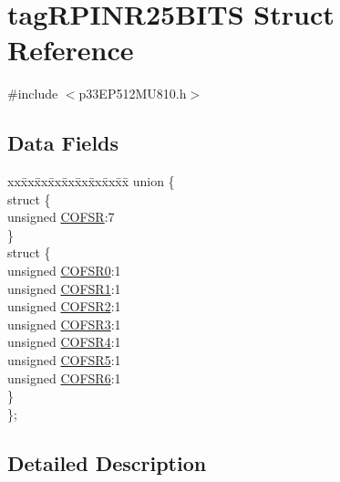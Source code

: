 \hypertarget{structtag_r_p_i_n_r25_b_i_t_s}{}\section{tag\+R\+P\+I\+N\+R25\+B\+I\+TS Struct Reference}
\label{structtag_r_p_i_n_r25_b_i_t_s}


{\ttfamily \#include $<$p33\+E\+P512\+M\+U810.\+h$>$}

\subsection*{Data Fields}
\begin{DoxyCompactItemize}
\item 
\begin{tabbing}
xx\=xx\=xx\=xx\=xx\=xx\=xx\=xx\=xx\=\kill
union \{\\
\>struct \{\\
\>\>unsigned \hyperlink{structtag_r_p_i_n_r25_b_i_t_s_ae600b0bef0d7ebcdb875433ba350e12c}{COFSR}:7\\
\>\} \\
\>struct \{\\
\>\>unsigned \hyperlink{structtag_r_p_i_n_r25_b_i_t_s_a187a459c15bb43212c0ad3ec1005215d}{COFSR0}:1\\
\>\>unsigned \hyperlink{structtag_r_p_i_n_r25_b_i_t_s_a7a8489e33028402e5441d48a82412bfc}{COFSR1}:1\\
\>\>unsigned \hyperlink{structtag_r_p_i_n_r25_b_i_t_s_ab4420ea07d072daf1ba3477a7ba7cc90}{COFSR2}:1\\
\>\>unsigned \hyperlink{structtag_r_p_i_n_r25_b_i_t_s_a49ca3b76cff2558df07fc1bf1fd4472b}{COFSR3}:1\\
\>\>unsigned \hyperlink{structtag_r_p_i_n_r25_b_i_t_s_ad920fb77cd218c24d0d53d15e1d0dd09}{COFSR4}:1\\
\>\>unsigned \hyperlink{structtag_r_p_i_n_r25_b_i_t_s_ab9ef65110b3359ee746828bc96a577de}{COFSR5}:1\\
\>\>unsigned \hyperlink{structtag_r_p_i_n_r25_b_i_t_s_a2eb1261741b67e7a548ea0dfc1e7c7da}{COFSR6}:1\\
\>\} \\
\}; \\

\end{tabbing}\end{DoxyCompactItemize}


\subsection{Detailed Description}


